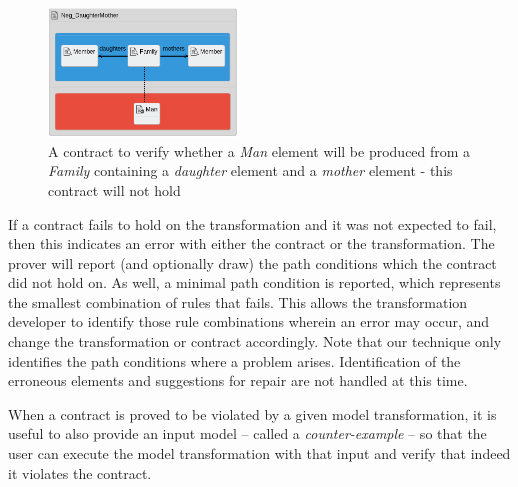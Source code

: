   \begin{figure}[t]
    \begin{center}
      \includegraphics[width=0.45\textwidth]{figures/FamToPersons/Neg_DaughterMother}
      \caption{A contract to verify whether a \emph{Man} element will be produced from a \emph{Family} containing a \emph{daughter} element and a \emph{mother} element - this contract will not hold}
      \label{fig:daughterMother}
    \end{center}
    \vspace{-0.20in}
  \end{figure}

If a contract fails to hold on the transformation and it was not expected to fail, then this indicates an error with either the contract or the transformation. The prover will report (and optionally draw) the path conditions which the contract did not hold on. As well, a minimal path condition is reported, which represents the smallest combination of rules that fails. This allows the transformation developer to identify those rule combinations wherein an error may occur, and change the transformation or contract accordingly. Note that our technique only identifies the path conditions where a problem arises. Identification of the erroneous elements and suggestions for repair are not handled at this time.



When a contract is proved to be violated by a given model transformation, it is
useful to also provide an input model -- called a \emph{counter-example} -- so
that the user can execute the model transformation with that input and verify
that indeed it violates the contract.

